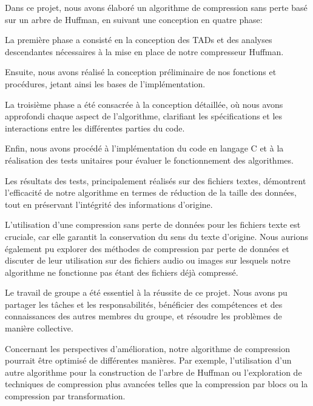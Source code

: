 
Dans ce projet, nous avons élaboré un algorithme de compression sans perte basé sur un arbre de Huffman, en suivant une conception en quatre phase:

    La première phase a consisté en la conception des TADs et des analyses descendantes nécessaires à la mise en place de notre compresseur Huffman.

    Ensuite, nous avons réalisé la conception préliminaire de nos fonctions et procédures, jetant ainsi les bases de l'implémentation.

    La troisième phase a été consacrée à la conception détaillée, où nous avons approfondi chaque aspect de l'algorithme, clarifiant les spécifications et les interactions entre les différentes parties du code.

    Enfin, nous avons procédé à l'implémentation du code en langage C et à la réalisation des tests unitaires pour évaluer le fonctionnement des algorithmes.

Les résultats des tests, principalement réalisés sur des fichiers textes, démontrent l'efficacité de notre algorithme en termes de réduction de la taille des données, tout en préservant l'intégrité des informations d'origine.

L'utilisation d'une compression sans perte de données pour les fichiers texte est cruciale, car elle garantit la conservation du sens du texte d'origine. Nous aurions également pu explorer des méthodes de compression par perte de données et discuter de leur utilisation sur des fichiers audio ou images sur lesquels notre algorithme ne fonctionne pas étant des fichiers déjà compressé.

Le travail de groupe a été essentiel à la réussite de ce projet. Nous avons pu partager les tâches et les responsabilités, bénéficier des compétences et des connaissances des autres membres du groupe, et résoudre les problèmes de manière collective.

Concernant les perspectives d'amélioration, notre algorithme de compression pourrait être optimisé de différentes manières. Par exemple, l'utilisation d'un autre algorithme pour la construction de l'arbre de Huffman ou l'exploration de techniques de compression plus avancées telles que la compression par blocs ou la compression par transformation.


